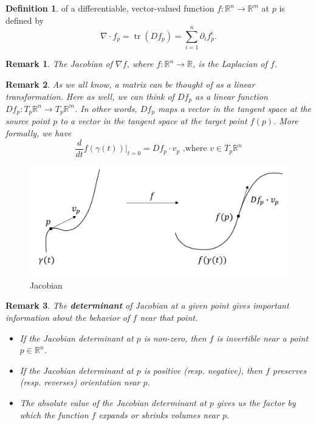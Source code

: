 \documentclass[a4paper]{article}
\theoremstyle{definition}
\newtheorem{definition}{Definition}
\theoremstyle{plain}
\newtheorem{remark}{Remark}
\begin{document}
\begin{definition}
 of a differentiable, vector-valued function $f:\mathbb{R}^n\rightarrow\mathbb{R}^m$ at $p$ is defined by
\begin{equation*}
    \nabla\cdot f_p=\operatorname{tr}(Df_p)=\sum^n_{i=1}\partial_if^i_p.
\end{equation*}
\end{definition}

\begin{remark}
The Jacobian of $\nabla f$, where $f:\mathbb{R}^n\rightarrow\mathbb{R}$, is the Laplacian of $f$.
\end{remark}

\begin{remark}
As we all know, a matrix can be thought of as a linear transformation. Here as well, we can think of $Df_p$ as a linear function $Df_p:T_p\mathbb{R}^n\rightarrow T_p\mathbb{R}^m$. In other words, $Df_p$ maps a vector in the tangent space at the source point $p$ to a vector in the tangent space at the target point $f(p)$. More formally, we have
\begin{equation*}
    \frac{d}{dt}f(\gamma(t))\rvert_{t=0}=Df_p\cdot v_p\text{ ,where } v\in T_p\mathbb{R}^n
\end{equation*}
\end{remark}

\begin{figure}[H]
   \centering
   \includegraphics[scale=0.3]{figure/jacobian.png}
   \caption{Jacobian}
\end{figure}

\begin{remark}
The \textbf{determinant} of Jacobian at a given point gives important information about the behavior of $f$ near that point. 
\begin{itemize}
    \item If the Jacobian determinant at $p$ is non-zero, then $f$ is invertible near a point $p\in\mathbb{R}^n$.
    \item If the Jacobian determinant at $p$ is positive (resp. negative), then $f$ preserves (resp. reverses) orientation near $p$.
    \item The absolute value of the Jacobian determinant at $p$ gives us the factor by which the function $f$ expands or shrinks volumes near $p$.
\end{itemize}
\end{remark}
\end{document}
